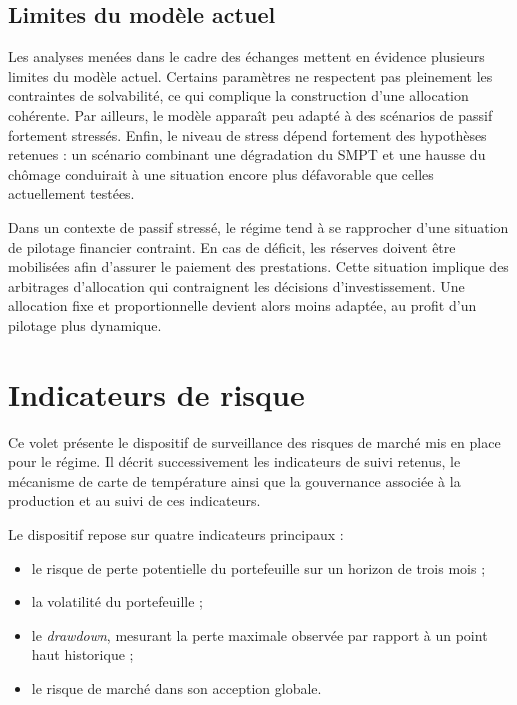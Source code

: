 \documentclass[11pt,a4paper]{article}
\begin{document}
\subsection{Limites du modèle actuel}

Les analyses menées dans le cadre des échanges mettent en évidence plusieurs limites du modèle actuel. Certains paramètres ne respectent pas pleinement les contraintes de solvabilité, ce qui complique la construction d’une allocation cohérente. Par ailleurs, le modèle apparaît peu adapté à des scénarios de passif fortement stressés. Enfin, le niveau de stress dépend fortement des hypothèses retenues : un scénario combinant une dégradation du SMPT et une hausse du chômage conduirait à une situation encore plus défavorable que celles actuellement testées.

Dans un contexte de passif stressé, le régime tend à se rapprocher d’une situation de pilotage financier contraint. En cas de déficit, les réserves doivent être mobilisées afin d’assurer le paiement des prestations. Cette situation implique des arbitrages d’allocation qui contraignent les décisions d’investissement. Une allocation fixe et proportionnelle devient alors moins adaptée, au profit d’un pilotage plus dynamique.

\section{Indicateurs de risque}

Ce volet présente le dispositif de surveillance des risques de marché mis en place pour le régime. Il décrit successivement les indicateurs de suivi retenus, le mécanisme de carte de température ainsi que la gouvernance associée à la production et au suivi de ces indicateurs.

Le dispositif repose sur quatre indicateurs principaux :

\begin{itemize}
    \item[$\bullet$] le risque de perte potentielle du portefeuille sur un horizon de trois mois ;
    \item[$\bullet$] la volatilité du portefeuille ;
    \item[$\bullet$] le \textit{drawdown}, mesurant la perte maximale observée par rapport à un point haut historique ;
    \item[$\bullet$] le risque de marché dans son acception globale.
\end{itemize}
\end{document}
